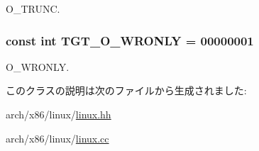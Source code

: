 O\_\-TRUNC. \hypertarget{classX86Linux64_a6156c069cefe05ce3cce033b2e0c2de2}{
\subsubsection[{TGT\_\-O\_\-WRONLY}]{\setlength{\rightskip}{0pt plus 5cm}const int {\bf TGT\_\-O\_\-WRONLY} = 00000001}}
\label{classX86Linux64_a6156c069cefe05ce3cce033b2e0c2de2}


O\_\-WRONLY. 

このクラスの説明は次のファイルから生成されました:\begin{DoxyCompactItemize}
\item 
arch/x86/linux/\hyperlink{arch_2x86_2linux_2linux_8hh}{linux.hh}\item 
arch/x86/linux/\hyperlink{arch_2x86_2linux_2linux_8cc}{linux.cc}\end{DoxyCompactItemize}
